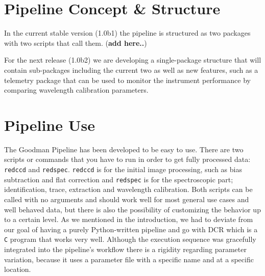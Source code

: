 \documentclass[11pt,twoside]{article}
\begin{document}
\section{Pipeline Concept \& Structure}

In the current stable version (1.0b1) the pipeline is structured as two packages
with two scripts that call them. ({\bf add here..})


% 
% 

For the next release (1.0b2) we are developing a single-package structure that will
contain sub-packages including the current two as well as new features, such as
a telemetry package that can be used to monitor the instrument performance by
comparing wavelength calibration parameters.

\section{Pipeline Use}
The Goodman Pipeline has been developed to be easy to use. There are two scripts
or commands that you have to run in order to get fully processed data:
\verb=redccd= and \verb=redspec=.
\verb=redccd= is for the initial image processing, such as bias
subtraction and flat correction and \verb=redspec= is for the spectroscopic
part; identification, trace, extraction and wavelength calibration.
Both scripts can be called with no arguments and should work well for most general use cases
and well behaved data, but there is also the possibility of customizing the behavior
up to a certain level. As we mentioned in the introduction, we had to deviate from
our goal of having a purely Python-written pipeline and go with DCR which is a 
\verb=C= program that works very well. Although the execution sequence was
gracefully integrated into the pipeline's workflow there is a rigidity regarding
parameter variation, because it uses a parameter file with a specific name and at
a specific location.
\end{document}
